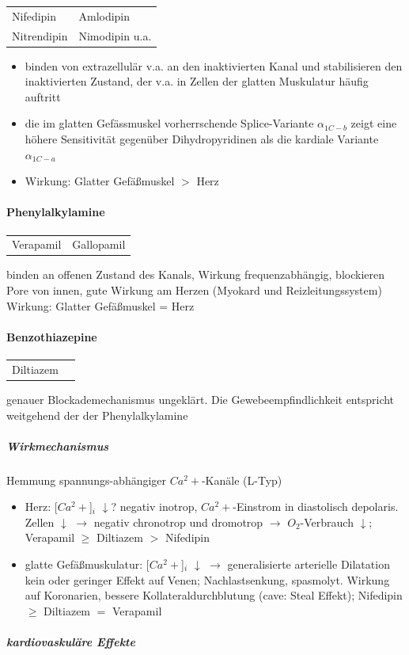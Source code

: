 \documentclass[10pt,a4paper]{report}
\begin{document}
\begin{tabularx}{\textwidth}{XX}
Nifedipin&Amlodipin\\ 
Nitrendipin&Nimodipin  u.a.\\
\end{tabularx}

\begin{itemize}
	\item binden von extrazellulär v.a. an den inaktivierten Kanal und stabilisieren den inaktivierten Zustand, der v.a. in Zellen der glatten Muskulatur häufig auftritt
	\item die im glatten Gefässmuskel vorherrschende Splice-Variante $\alpha_{1C-b}$ zeigt eine höhere Sensitivität gegenüber Dihydropyridinen als die kardiale Variante $\alpha_{1C-a}$
	\item Wirkung: Glatter Gefäßmuskel $>$ Herz
\end{itemize}

\paragraph{Phenylalkylamine}
\begin{tabularx}{\textwidth}{XX}
Verapamil&Gallopamil\\
\end{tabularx}
binden an offenen Zustand des Kanals, Wirkung frequenzabhängig, blockieren Pore von innen, gute Wirkung am Herzen (Myokard und Reizleitungssystem) Wirkung: Glatter Gefäßmuskel = Herz

\paragraph{Benzothiazepine}
\begin{tabularx}{\textwidth}{XX}
Diltiazem&\\
\end{tabularx}
genauer Blockademechanismus ungeklärt. Die Gewebeempfindlichkeit entspricht weitgehend der der Phenylalkylamine
\subparagraph{Wirkmechanismus} Hemmung spannungs-abhängiger $Ca^2+$-Kanäle (L-Typ)
\begin{itemize}
	\item Herz: 	[$Ca^2+$]$_i$ $\downarrow$? negativ inotrop, $Ca^2+$-Einstrom in diastolisch depolaris. Zellen $\downarrow$ $\rightarrow$ negativ chronotrop und dromotrop $\rightarrow$ $O_2$-Verbrauch $\downarrow$; Verapamil $\geq$ Diltiazem $>$ Nifedipin
	\item glatte Gefäßmuskulatur:  [$Ca^2+$]$_i$ $\downarrow$  $\rightarrow$ generalisierte arterielle Dilatation
	kein oder geringer Effekt auf Venen; Nachlastsenkung, spasmolyt. 
	Wirkung auf Koronarien, bessere Kollateraldurchblutung (cave: Steal 	Effekt); Nifedipin $\geq$ Diltiazem $=$ Verapamil
\end{itemize}
\subparagraph{kardiovaskuläre Effekte} \mbox{} \\
 
\end{document}
